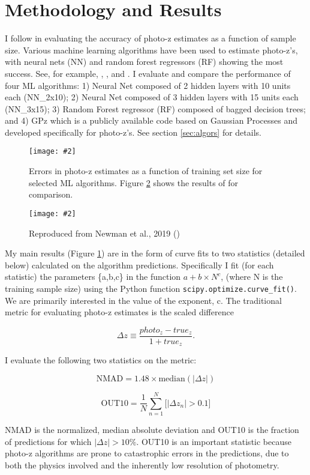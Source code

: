 \documentclass[13pt]{amsart}
\newcommand{\nequ}[2]{\begin{equation}#1 \label{#2}\end{equation}}
\newcommand{\equin}[1]{\(#1\)}
\newcommand{\figscale}[4]{
\begin{figure}[ht]
    \centering
    \caption{#3}
    \label{#4}
    \texttt{[image: \#2]}
\end{figure}
}
\begin{document}
\section{Methodology and Results}

  I follow \cite{newman} in evaluating the accuracy of photo-z estimates as a function of sample size. Various machine learning algorithms have been used to estimate photo-z's, with neural nets (NN) and random forest regressors (RF) showing the most success. See, for example, \cite{pzreview}, \cite{annz2}, and \cite{tpz}. I evaluate and compare the performance of four ML algorithms: 1) Neural Net composed of 2 hidden layers with 10 units each (NN\_2x10); 2) Neural Net composed of 3 hidden layers with 15 units each (NN\_3x15); 3) Random Forest regressor (RF) composed of bagged decision trees; and 4) GPz which is a publicly available code based on Gaussian Processes and developed specifically for photo-z's. See section \ref{sec:algors} for details.

  \figscale{1}{../data/errors_plots/errors.png}{Errors in photo-z estimates as a function of training set size for selected ML algorithms. Figure \ref{fig:newman} shows the results of \cite{newman} for comparison.}{fig:errs}

  \figscale{1}{../proposal/photozerrors.png}{Reproduced from Newman et al., 2019 (\cite{newman})}{fig:newman}


  My main results (Figure \ref{fig:errs}) are in the form of curve fits to two statistics (detailed below) calculated on the algorithm predictions. Specifically I fit (for each statistic) the parameters \{a,b,c\} in the function
  \equin{a+b \times N^c},
  (where N is the training sample size) using the Python function \texttt{scipy.optimize.curve\_fit()}. We are primarily interested in the value of the exponent, c.
  The traditional metric for evaluating photo-z estimates is the scaled difference

  \nequ{\Delta z \equiv \frac{photo_z-true_z}{1+true_z}.}{equ:deltaz}

  I evaluate the following two statistics on the metric:

  \nequ{\textrm{NMAD} = 1.48 \times \textrm{median}(|\Delta z|)}{equ:nmad}

  \nequ{\textrm{OUT10} = \frac{1}{N} \sum_{n=1}^N \big[ | \Delta z_n | > 0.1 \big]}{equ:out10}

  NMAD is the normalized, median absolute deviation and OUT10 is the fraction of predictions for which \equin{|\Delta z| > 10\%}. OUT10 is an important statistic because photo-z algorithms are prone to catastrophic errors in the predictions, due to both the physics involved and the inherently low resolution of photometry.
\end{document}
